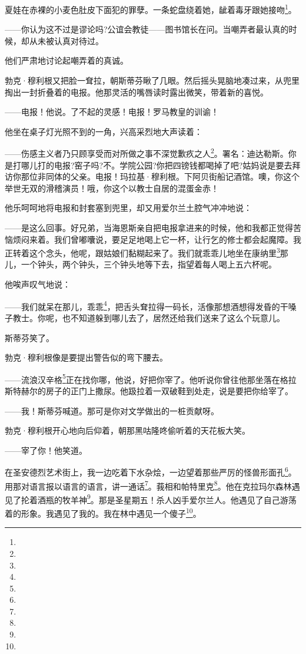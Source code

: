 \par 夏娃在赤裸的小麦色肚皮下面犯的罪孽。一条蛇盘绕着她，龇着毒牙跟她接吻\footnote{}。
\par ——你认为这不过是谬论吗?公谊会教徒——图书馆长在问。当嘲弄者最认真的时候，却从未被认真对待过。
\par 他们严肃地讨论起嘲弄着的真诚。
\par 勃克·穆利根又把脸一耷拉，朝斯蒂芬瞅了几眼。然后摇头晃脑地凑过来，从兜里掏出一封折叠着的电报。他那灵活的嘴唇读时露出微笑，带着新的喜悦。
\par ——电报！他说。了不起的灵感！电报！罗马教皇的训谕！
\par 他坐在桌子灯光照不到的一角，兴高采烈地大声读着：
\par ——伤感主义者乃只顾享受而对所做之事不深觉歉疚之人\footnote{}。署名：迪达勒斯。你是打哪儿打的电报?窑子吗?不。学院公园?你把四镑钱都喝掉了吧?姑妈说是要去拜访你那位非同体的父亲。电报！玛拉基·穆利根。下阿贝街船记酒馆。噢，你这个举世无双的滑稽演员！哦，你这个以教士自居的混蛋金赤！
\par 他乐呵呵地将电报和封套塞到兜里，却又用爱尔兰土腔气冲冲地说：
\par ——是这么回事。好兄弟，当海恩斯亲自把电报拿进来的时候，他和我都正觉得苦恼烦闷来着。我们曾嘟囔说，要足足地喝上它一杯，让行乞的修士都会起魔障。我正转着这个念头，他呢，跟姑娘们黏糊起来了。我们就乖乖儿地坐在康纳里\footnote{}那儿，一个钟头，两个钟头，三个钟头地等下去，指望着每人喝上五六杯呢。
\par 他唉声叹气地说：
\par ——我们就呆在那儿，乖乖\footnote{}，把舌头耷拉得一码长，活像那想酒想得发昏的干嗓子教士。你呢，也不知道躲到哪儿去了，居然还给我们送来了这么个玩意儿。
\par 斯蒂芬笑了。
\par 勃克·穆利根像是要提出警告似的弯下腰去。
\par ——流浪汉辛格\footnote{}正在找你哪，他说，好把你宰了。他听说你曾往他那坐落在格拉斯特赫尔的房子的正门上撒尿。他趿拉着一双破鞋到处走，说是要把你给宰了。
\par ——我！斯蒂芬喊道。那可是你对文学做出的一桩贡献呀。
\par 勃克·穆利根开心地向后仰着，朝那黑咕隆咚偷听着的天花板大笑。
\par ——宰了你！他笑道。
\par 在圣安德烈艺术街上，我一边吃着下水杂烩，一边望着那些严厉的怪兽形面孔\footnote{}。用那对语言报以语言的语言，讲一通话\footnote{}。莪相和帕特里克\footnote{}。他在克拉玛尔森林遇见了抡着酒瓶的牧羊神\footnote{}。那是圣星期五！杀人凶手爱尔兰人。他遇见了自己游荡着的形象。我遇见了我的。我在林中遇见一个傻子\footnote{}。
